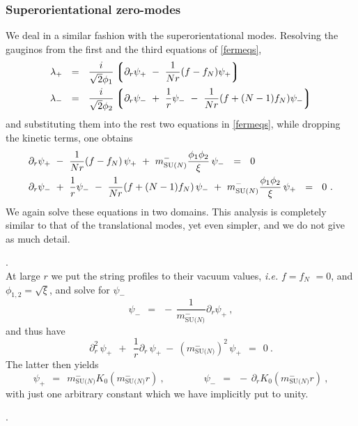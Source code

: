 \documentclass[12pt]{article}
\def\beq{\begin{equation}}
\def\eeq{\end{equation}}
\newcommand{\p}{\partial}
\newcommand{\lgr}{\left\lgroup}
\newcommand{\rgr}{\right\rgroup}
\newcommand{\mNm}{m_\text{SU($N$)}^{-}}
\begin{document}
\subsubsection{Superorientational zero-modes}
	We deal in a similar fashion with the superorientational modes.
	Resolving the gauginos from the first and the third equations of \eqref{fermeqs},
\begin{align}
%
\notag
	\lambda_+ & ~~=~~ \frac{i}{\sqrt{2}\phi_1} \lgr \p_r \psi_+ ~-~ \frac{1}{Nr}(f - f_N)\psi_+ \rgr  \\
%
\notag
	\lambda_- & ~~=~~ \frac{i}{\sqrt{2}\phi_2} \lgr \p_r \psi_- ~+~ \frac{1}{r} \psi_- ~-~ \frac{1}{Nr}(f + (N-1)f_N)\psi_- \rgr
\end{align}
	and substituting them into the rest two equations in \eqref{fermeqs}, while dropping 
	the kinetic terms, one obtains
\begin{align}
%
\notag
	& \p_r \psi_+ ~-~ \frac{1}{Nr} (f - f_N)\, \psi_+ ~+~ \mNm \frac{\phi_1\phi_2}{\xi}\, \psi_- ~~=~~ 0 \\
%
\label{orient_large_mu}
	& \p_r \psi_- ~+~ \frac{1}{r}\psi_- ~-~ \frac{1}{Nr}(f + (N-1)f_N)\, \psi_- ~+~ \mNm \frac{\phi_1\phi_2}{\xi}\, \psi_+ ~~=~~ 0~.
\end{align}
	We again solve these equations in two domains.
	This analysis is completely similar to that of the translational modes, yet even simpler,
	and we do not give as much detail.

	{.}\\
	At large $ r $ we put the string profiles to their vacuum values, {\it i.e.} $ f = f_N $ $ = 0 $,
	and $ \phi_{1,2} = \sqrt{\xi} $, and solve for $ \psi_- $
\[
	\psi_- ~~=~~ -\,\frac{1}{\mNm} \p_r \psi_+~,
\]
	and thus have
\[	
	\p_r^2\, \psi_+  ~~+~~ \frac{1}{r}\p_r\, \psi_+ ~-~ (\mNm)^2\, \psi_+ ~~=~~ 0~.
\]
	The latter then yields 
\beq
\label{sorient_K}
	\psi_+ ~~=~~ \mNm K_0(\mNm r)~, \qquad\qquad \psi_- ~~=~~ -\, \p_r K_0(\mNm r)~,
\eeq
	with just one arbitrary constant which we have implicitly put to unity.

	{.}
\end{document}
